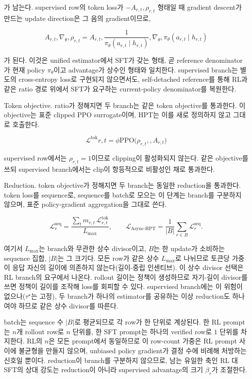 가 남는다. supervised row의 token loss가 $-A_{r,t},\rho_{r,t}$ 형태일 때 gradient descent가 만드는 update direction은 그 음의 gradient이므로,

$$A_{r,t},\nabla_\theta, \rho_{r,t} = A_{r,t},\frac{1}{\pi_\theta(a_{r,t} \mid h_{r,t})},\nabla_\theta, \pi_\theta(a_{r,t} \mid h_{r,t})$$

가 된다. 이것은 unified estimator에서 SFT가 갖는 형태, 곧 reference denominator가 현재 policy $\pi_\theta$이고 advantage가 상수인 형태와 일치한다. supervised branch는 별도의 cross-entropy loss로 구현되지 않으면서도, self-detached reference를 통해 RL과 같은 ratio 경로 위에서 SFT가 요구하는 current-policy denominator를 복원한다.

Token objective. ratio가 정해지면 두 branch는 같은 token objective를 통과한다. 이 objective는 표준 clipped PPO surrogate이며, HPT는 이를 새로 정의하지 않고 그대로 호출한다.

$$\mathcal{L}^{\mathrm{tok}}{r,t} = \phi{\mathrm{PPO}}\big(\rho_{r,t},, A_{r,t}\big)$$

supervised row에서는 $\rho_{r,t} = 1$이므로 clipping이 활성화되지 않는다. 같은 objective를 쓰되 supervised branch에서는 clip이 항등적으로 비활성인 채로 통과한다.

Reduction. token objective가 정해지면 두 branch는 동일한 reduction을 통과한다. token loss를 sequence로, sequence를 batch로 모으는 이 단계는 branch를 구분하지 않으며, 표준 policy-gradient aggregation을 그대로 쓴다.

$$\mathcal{L}^{\mathrm{seq}}_{r} = \frac{\sum_{t} m_{r,t}\,\mathcal{L}^{\mathrm{tok}}_{r,t}}{L_{\max}}, \qquad \mathcal{L}_{\mathrm{Async\text{-}HPT}} = \frac{1}{\lvert B \rvert} \sum_{r \in B} \mathcal{L}^{\mathrm{seq}}_{r}.$$

여기서 $L_{\max}$는 branch와 무관한 상수 divisor이고, $B$는 한 update가 소비하는 sequence 집합, $\lvert B \rvert$는 그 크기다. 모든 row가 같은 상수 $L_{\max}$로 나뉘므로 토큰당 가중이 응답 자신의 길이에 의존하지 않는다(길이-중립 인센티브). 이 상수 divisor 선택은 RL branch의 요구에서 나온다. rollout 길이는 정책이 생성하므로 자기-길이 divisor를 쓰면 정책이 길이를 조작해 loss를 회피할 수 있다. supervised branch에는 이 위험이 없으나($\tau^\star$는 고정), 두 branch가 하나의 estimator를 공유하는 이상 reduction도 하나여야 하므로 같은 상수 divisor를 따른다.

batch는 sequence 수 $\lvert B \rvert$로 평균되므로 각 row가 한 단위로 계상된다. 한 RL prompt는 $n$개 rollout row로 $n$ 단위를, 한 SFT prompt는 하나의 verified row로 $1$ 단위를 차지한다. RL의 $n$은 모든 prompt에서 동일하므로 이 row-count 가중은 RL prompt 사이에 불균형을 만들지 않으며, unbiased policy gradient가 결정 수에 비례해 처방하는 신호일 뿐이다. reduction이 branch를 구분하지 않으므로, 남는 유일한 축인 RL 대 SFT의 상대 강도는 reduction이 아니라 supervised advantage의 크기 $\beta_r$가 조절한다.


